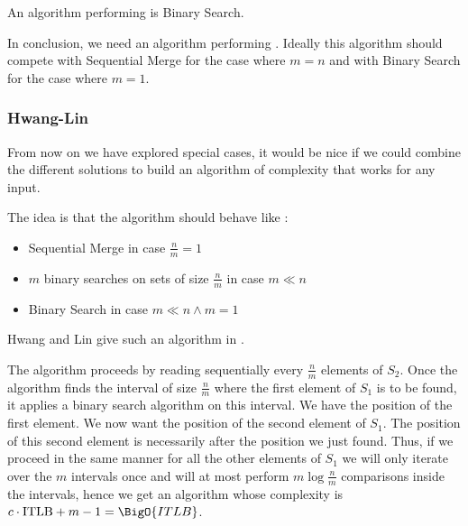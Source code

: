 An algorithm performing  is Binary Search.






In conclusion, we need an algorithm performing . Ideally this algorithm should compete with Sequential Merge for the case where $m = n$ and with Binary Search for the case where $m = 1$.



\subsubsection{Hwang-Lin}

From now on we have explored special cases, it would be nice if we could combine the different solutions to build an algorithm of complexity  that works for any input.

The idea is that the algorithm should behave like :

\begin{itemize}
\item Sequential Merge in case $\frac{n}{m} = 1$
\item $m$ binary searches on sets of size $\frac{n}{m}$ in case $m \ll n$
\item Binary Search in case $m \ll n \land m = 1$
\end{itemize}

Hwang and Lin give such an algorithm in \cite{DBLP:journals/siamcomp/HwangL72}.

The algorithm proceeds by reading sequentially every $\frac{n}{m}$ elements of $S_2$. Once the algorithm finds the interval of size $\frac{n}{m}$ where the first element of $S_1$ is to be found, it applies a binary search algorithm on this interval. We have the position of the first element.
We now want the position of the second element of $S_1$. The position of this second element is necessarily after the position we just found. Thus, if we proceed in the same manner for all the other elements of $S_1$ we will only iterate over the $m$ intervals once and will at most perform $m \log\frac{n}{m}$ comparisons inside the intervals, hence we get an algorithm whose complexity is $c \cdot \text{ITLB} + m - 1 = \BigO{ITLB}$.

